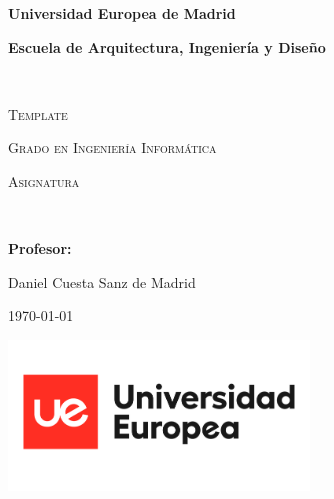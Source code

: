
\begin{titlepage}
\centering
{\bfseries\LARGE Universidad Europea de Madrid \par}
\vspace{0cm}
{\bfseries\LARGE Escuela de Arquitectura, Ingeniería y Diseño \par}
\vfill
\noindent\hrulefill \\
{\scshape\Huge Template \par} %
\vspace{0.5cm}
{\scshape\Large Grado en Ingeniería Informática \par}
\vspace{0.5cm}
{\scshape\Large Asignatura \par} 
\noindent\hrulefill \\
\vfill
{\bfseries\Large Profesor: \par}
\vfill
{\Large Daniel Cuesta Sanz de Madrid}
\vfill
{\large\today \par} %

{\includegraphics[height=4cm]{logo.png}}
\end{titlepage}
\setcounter{page}{1}
\newpage
